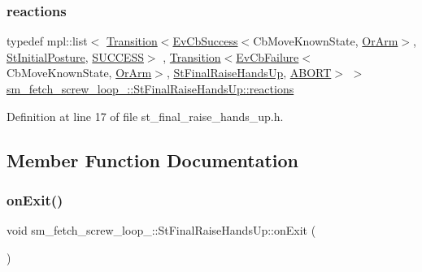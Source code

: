 \subsubsection{\texorpdfstring{reactions}{reactions}}
{\footnotesize\ttfamily typedef mpl\+::list$<$ \hyperlink{classsmacc_1_1Transition}{Transition}$<$\hyperlink{structsmacc_1_1EvCbSuccess}{Ev\+Cb\+Success}$<$Cb\+Move\+Known\+State, \hyperlink{classsm__fetch__screw__loop__1_1_1OrArm}{Or\+Arm}$>$, \hyperlink{structsm__fetch__screw__loop__1_1_1StInitialPosture}{St\+Initial\+Posture}, \hyperlink{structsmacc_1_1default__transition__tags_1_1SUCCESS}{S\+U\+C\+C\+E\+SS}$>$ , \hyperlink{classsmacc_1_1Transition}{Transition}$<$\hyperlink{structsmacc_1_1EvCbFailure}{Ev\+Cb\+Failure}$<$Cb\+Move\+Known\+State, \hyperlink{classsm__fetch__screw__loop__1_1_1OrArm}{Or\+Arm}$>$, \hyperlink{structsm__fetch__screw__loop__1_1_1StFinalRaiseHandsUp}{St\+Final\+Raise\+Hands\+Up}, \hyperlink{structsmacc_1_1default__transition__tags_1_1ABORT}{A\+B\+O\+RT}$>$ $>$ \hyperlink{structsm__fetch__screw__loop__1_1_1StFinalRaiseHandsUp_aa0342e007f95e923372c938e67110cb5}{sm\+\_\+fetch\+\_\+screw\+\_\+loop\+\_\+::\+St\+Final\+Raise\+Hands\+Up\+::reactions}}



Definition at line 17 of file st\+\_\+final\+\_\+raise\+\_\+hands\+\_\+up.\+h.



\subsection{Member Function Documentation}
\mbox{\label{structsm__fetch__screw__loop__1_1_1StFinalRaiseHandsUp_ab348fa602156f36fdcd998fd3ec16578}} 
\subsubsection{\texorpdfstring{on\+Exit()}{onExit()}}
{\footnotesize\ttfamily void sm\+\_\+fetch\+\_\+screw\+\_\+loop\+\_\+::\+St\+Final\+Raise\+Hands\+Up\+::on\+Exit (\begin{DoxyParamCaption}\item[{\hyperlink{structsmacc_1_1default__transition__tags_1_1ABORT}{A\+B\+O\+RT}}]{ }\end{DoxyParamCaption})\hspace{0.3cm}{\ttfamily [inline]}}



